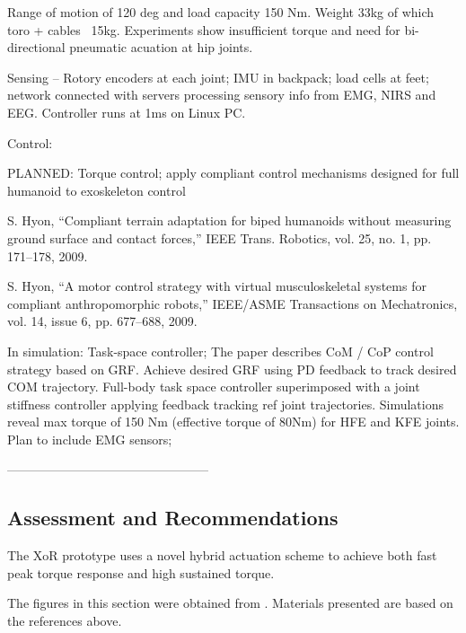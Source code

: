 Range of motion of 120 deg and load capacity 150 Nm.  Weight 33kg of which toro + cables ~15kg. Experiments show insufficient torque and need for bi-directional pneumatic acuation at hip joints.

Sensing -- Rotory encoders at each joint; IMU in backpack; load cells at feet; network connected with servers processing sensory info from EMG, NIRS and EEG.  Controller runs at 1ms on Linux PC.


Control:

PLANNED: Torque control; apply compliant control mechanisms designed for full humanoid to exoskeleton control

S. Hyon, “Compliant terrain adaptation for biped humanoids without
measuring ground surface and contact forces,” IEEE Trans. Robotics,
vol. 25, no. 1, pp. 171–178, 2009.

S. Hyon, “A motor control strategy with virtual musculoskeletal
systems for compliant anthropomorphic robots,” IEEE/ASME Transactions
on Mechatronics, vol. 14, issue 6, pp. 677–688, 2009.

In simulation:
Task-space controller; The paper describes CoM / CoP control strategy based on GRF.  Achieve desired GRF using PD feedback to track desired COM trajectory.  Full-body task space controller superimposed with a joint stiffness controller applying feedback tracking ref joint trajectories.  Simulations reveal max torque of 150 Nm (effective torque of 80Nm) for HFE and KFE joints.  Plan to include EMG sensors;

------------------------------------------------

\subsection{Assessment and Recommendations}

The XoR prototype uses a novel hybrid actuation scheme to achieve both fast peak torque response and high sustained torque.  


% 
% 

The figures in this section were obtained from \cite{xorDesign2011}. Materials presented are based on the references above.